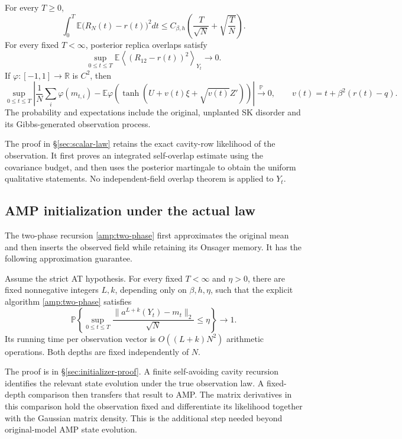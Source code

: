 \documentclass[11pt,reqno]{amsart}
\begin{document}
\begin{prop}\label{prop:scalar-law}
For every $T\ge0$,
\[
 \int_0^T\mathbb E\bigl(R_N(t)-r(t)\bigr)^2dt
 \le C_{\beta,h}\left(\frac{T}{\sqrt N}+\sqrt{\frac TN}\right).
\]
For every fixed $T<\infty$, posterior replica overlaps satisfy
\[
 \sup_{0\le t\le T}
 \mathbb E\left\langle(R_{12}-r(t))^2\right\rangle_{Y_t}\longrightarrow0.
\]
If $\varphi:[-1,1]\to\mathbb R$ is $C^2$, then
\[
 \sup_{0\le t\le T}
 \left|\frac1N\sum_i\varphi(m_{t,i})
 -\mathbb E\varphi\!\left(\tanh(U+v(t)\xi+\sqrt{v(t)}Z')\right)\right|
 \xrightarrow{\mathbb P}0,
 \qquad v(t)=t+\beta^2(r(t)-q).
\]
The probability and expectations include the original, unplanted SK
disorder and its Gibbs-generated observation process.
\end{prop}

The proof in \S\ref{sec:scalar-law} retains the exact cavity-row likelihood of the observation. It first proves an integrated self-overlap estimate using the covariance budget, and then uses the posterior martingale to obtain the uniform qualitative statements. No independent-field overlap theorem is applied to $Y_t$.

\subsection{AMP initialization under the actual law}\label{sec:amp-summary}

The two-phase recursion \eqref{amp:two-phase} first approximates the original mean and then inserts the observed field while retaining its Onsager memory. It has the following approximation guarantee.

\begin{thm}\label{amp:actual}
Assume the strict AT hypothesis. For every fixed $T<\infty$ and
$\eta>0$, there are fixed nonnegative integers $L,k$, depending only on
$\beta,h,\eta$, such that the explicit algorithm
\eqref{amp:two-phase} satisfies
\[
 \mathbb P\left\{\sup_{0\le t\le T}
     \frac{\|a^{L+k}(Y_t)-m_t\|_2}{\sqrt N}\le\eta\right\}
 \longrightarrow1.
\]
Its running time per observation vector is $O((L+k)N^2)$ arithmetic
operations. Both depths are fixed independently of $N$.
\end{thm}

The proof is in \S\ref{sec:initializer-proof}. A finite self-avoiding cavity recursion identifies the relevant state evolution under the true observation law. A fixed-depth comparison then transfers that result to AMP. The matrix derivatives in this comparison hold the observation fixed and differentiate its likelihood together with the Gaussian matrix density. This is the additional step needed beyond original-model AMP state evolution.
\end{document}
